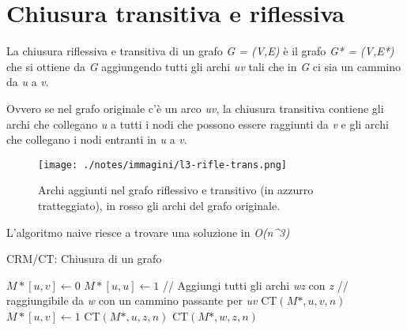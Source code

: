 
\section{Chiusura transitiva e riflessiva}\label{chiusura-transitiva-e-riflessiva}

La chiusura riflessiva e transitiva di un grafo \emph{G = (V,E)} è il
grafo \emph{G* = (V,E*)} che si ottiene da \emph{G} aggiungendo tutti
gli archi \emph{uv} tali che in \emph{G} ci sia un cammino da \emph{u} a
\emph{v}.

Ovvero se nel grafo originale c'è un arco \emph{uv}, la chiusura
transitiva contiene gli archi che collegano \emph{u} a tutti i nodi che
possono essere raggiunti da \emph{v} e gli archi che collegano i nodi
entranti in \emph{u} a \emph{v}.

\begin{figure}[htbp]
\centering
\texttt{[image: ./notes/immagini/l3-rifle-trans.png]}
\caption{Archi aggiunti nel grafo riflessivo e transitivo (in azzurro
tratteggiato), in rosso gli archi del grafo originale.}
\end{figure}

L'algoritmo naive riesce a trovare una soluzione in \emph{O(n\^{}3)}

\begin{breakablealgorithm}
	\caption{CRM/CT: Chiusura di un grafo}
	\begin{algorithmic}[1]
					\State $M*[u,v] \gets 0$
				\EndFor
			\EndFor
			 
				\State $M*[u,u] \gets 1$
			\EndFor
					\State // Aggiungi tutti gli archi \textit{wz} con \textit{z}
					\State // raggiungibile da \textit{w} con un cammino passante per \textit{uv}
					\State \textsc{CT}$(M*,u,v,n)$
				\EndIf
				\EndFor
			\EndFor
		\EndFunction
		\Statex
			\State $M*[u,v] \gets 1$
					\State \textsc{CT}$(M*, u, z, n)$
				\EndIf
			\EndFor
					\State \textsc{CT}$(M*, w, z, n)$
				\EndIf
			\EndFor
		\EndFunction
	\end{algorithmic}
\end{breakablealgorithm}

